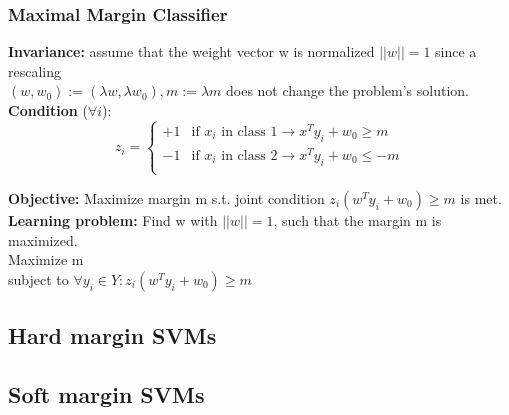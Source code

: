 \documentclass[main]{subfiles}
\begin{document}
\subsubsection{Maximal Margin Classifier}
\textbf{Invariance:} assume that the weight vector w is normalized
\( ||w|| = 1\) since a rescaling\\ \((w, w_0 ) := (\lambda w, \lambda w_0 ), m := \lambda m\) does not change the problem's solution.\\
\textbf{Condition }(\(\forall i\)):
\[z_i =
\begin{cases}
+1 & \mbox{if } x_i \text{ in class } 1 \rightarrow x^Ty_i + w_0 \geq m\\
-1 & \mbox{if } x_i \text{ in class } 2 \rightarrow x^Ty_i + w_0 \leq -m\\
\end{cases}
\]

\textbf{Objective:} Maximize margin m s.t. joint condition \(z_i (w^T y_i + w_0 ) \geq m\) is met.\\

\textbf{Learning problem:} Find w with \(||w|| = 1\), such that the margin m
is maximized.\\
Maximize m\\
subject to \(\forall y_i \in Y : z_i (w^T y_i + w_0 ) \geq m\)
\subsection{Hard margin SVMs}
\subsection{Soft margin SVMs}
\end{document}
